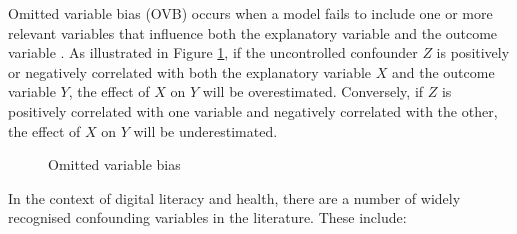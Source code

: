Omitted variable bias (OVB) occurs when a model fails to include one or more relevant variables that influence both the explanatory variable and the outcome variable \Parencite[p. 59]{angrist_mostly_2009}. As illustrated in Figure \ref{fig:ovb}, if the uncontrolled confounder $Z$ is positively or negatively correlated with both the explanatory variable $X$ and the outcome variable $Y$, the effect of $X$ on $Y$ will be overestimated. Conversely, if $Z$ is positively correlated with one variable and negatively correlated with the other, the effect of $X$ on $Y$ will be underestimated. 

\begin{figure}[h!]
    \centering
    \caption{Omitted variable bias}
    \label{fig:ovb}
\end{figure}

In the context of digital literacy and health, there are a number of widely recognised confounding variables in the literature. These include:

